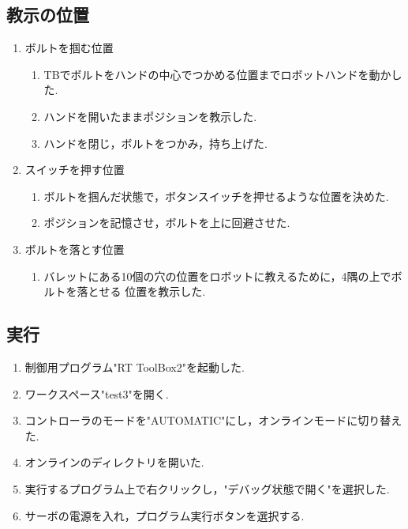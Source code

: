 \documentclass[10pt,a4j]{jsarticle}
\begin{document}
  \subsection{教示の位置}
    \begin{enumerate}
      \item ボルトを掴む位置 \\
        \begin{enumerate}
          \item TBでボルトをハンドの中心でつかめる位置までロボットハンドを動かした. \\
          \item ハンドを開いたままポジションを教示した. \\
          \item ハンドを閉じ，ボルトをつかみ，持ち上げた.
        \end{enumerate}
      \item スイッチを押す位置 \\
        \begin{enumerate}
          \item ボルトを掴んだ状態で，ボタンスイッチを押せるような位置を決めた. \\
          \item ポジションを記憶させ，ボルトを上に回避させた. \\
        \end{enumerate}
      \item ボルトを落とす位置 \\
        \begin{enumerate}
          \item バレットにある10個の穴の位置をロボットに教えるために，4隅の上でボルトを落とせる
            位置を教示した.
        \end{enumerate}
    \end{enumerate}

  \subsection{実行}
    \begin{enumerate}
      \item 制御用プログラム"RT ToolBox2"を起動した. \\
      \item ワークスペース"test3"を開く. \\
      \item コントローラのモードを"AUTOMATIC"にし，オンラインモードに切り替えた. \\
      \item オンラインのディレクトリを開いた. \\
      \item 実行するプログラム上で右クリックし，"デバッグ状態で開く"を選択した. \\
      \item サーボの電源を入れ，プログラム実行ボタンを選択する. \\
    \end{enumerate}
\end{document}
